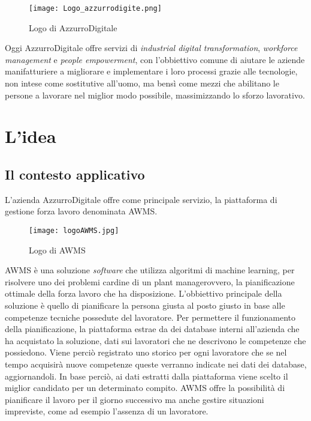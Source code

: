 \begin{figure}[h]
	\begin{center}
		\texttt{[image: Logo\_azzurrodigite.png]}
			\caption{Logo di AzzurroDigitale}
	\end{center}
\end{figure}
\pagebreak

Oggi AzzurroDigitale offre servizi di \emph{industrial digital transformation}, \emph{workforce management} e \emph{people empowerment}, con l'obbiettivo comune di aiutare le aziende manifatturiere a migliorare e implementare i loro processi grazie alle tecnologie, non intese come sostitutive all’uomo, ma bensì come mezzi che abilitano le persone a lavorare nel miglior modo possibile, massimizzando lo sforzo lavorativo.\\

\section{L'idea}

\subsection{Il contesto applicativo}
L'azienda AzzurroDigitale offre come principale servizio, la piattaforma di gestione forza lavoro denominata \gls{AWMS}.\\
	\begin{figure}[!h] 
		\begin{center}
			\texttt{[image: logoAWMS.jpg]}
			\caption{Logo di AWMS}
		\end{center}
	\end{figure}

\gls{AWMS} è una soluzione \emph{software} che utilizza algoritmi di \gls{machine learning}\glsfirstoccur, per risolvere uno dei problemi cardine di un \gls{plant manager}\glsfirstoccur ovvero, la pianificazione ottimale della forza lavoro che ha disposizione. L'obbiettivo principale della soluzione è quello di pianificare la persona giusta al posto giusto in base alle competenze tecniche possedute del lavoratore. Per permettere il funzionamento della pianificazione, la piattaforma estrae da dei database interni all'azienda che ha acquistato la soluzione, dati sui lavoratori che ne descrivono le competenze che possiedono. Viene perciò registrato uno storico per ogni lavoratore che se nel tempo acquisirà nuove competenze queste verranno indicate nei dati dei database, aggiornandoli. In base perciò, ai dati estratti dalla piattaforma viene scelto il miglior candidato per un determinato compito. \gls{AWMS} offre la possibilità di pianificare il lavoro per il giorno successivo ma anche gestire situazioni impreviste, come ad esempio l'assenza di un lavoratore.

